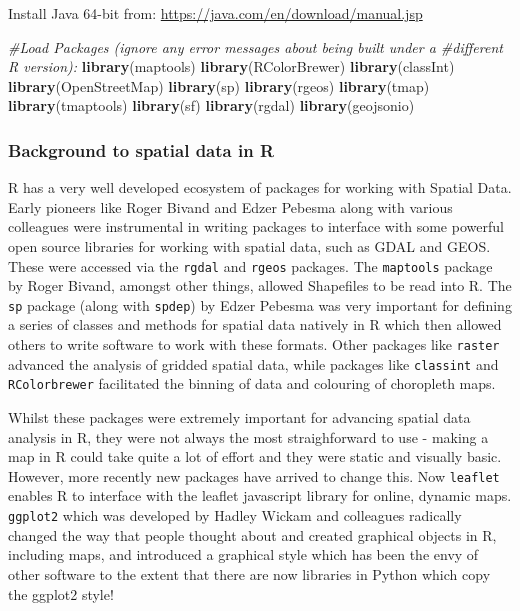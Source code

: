 \documentclass[]{book}
\newenvironment{Shaded}{\begin{snugshade}}{\end{snugshade}}
\newcommand{\CommentTok}[1]{\textcolor[rgb]{0.56,0.35,0.01}{\textit{#1}}}
\newcommand{\KeywordTok}[1]{\textcolor[rgb]{0.13,0.29,0.53}{\textbf{#1}}}
\newcommand{\NormalTok}[1]{#1}
\begin{document}
Install Java 64-bit from: \url{https://java.com/en/download/manual.jsp}

\begin{Shaded}
\begin{Highlighting}[]
\CommentTok{#Load Packages (ignore any error messages about being built under a #different R version):}
\KeywordTok{library}\NormalTok{(maptools)}
\KeywordTok{library}\NormalTok{(RColorBrewer)}
\KeywordTok{library}\NormalTok{(classInt)}
\KeywordTok{library}\NormalTok{(OpenStreetMap)}
\KeywordTok{library}\NormalTok{(sp)}
\KeywordTok{library}\NormalTok{(rgeos)}
\KeywordTok{library}\NormalTok{(tmap)}
\KeywordTok{library}\NormalTok{(tmaptools)}
\KeywordTok{library}\NormalTok{(sf)}
\KeywordTok{library}\NormalTok{(rgdal)}
\KeywordTok{library}\NormalTok{(geojsonio)}
\end{Highlighting}
\end{Shaded}

\hypertarget{background-to-spatial-data-in-r}{%
\subsubsection{Background to spatial data in R}\label{background-to-spatial-data-in-r}}

R has a very well developed ecosystem of packages for working with Spatial Data. Early pioneers like Roger Bivand and Edzer Pebesma along with various colleagues were instrumental in writing packages to interface with some powerful open source libraries for working with spatial data, such as GDAL and GEOS. These were accessed via the \texttt{rgdal} and \texttt{rgeos} packages. The \texttt{maptools} package by Roger Bivand, amongst other things, allowed Shapefiles to be read into R. The \texttt{sp} package (along with \texttt{spdep}) by Edzer Pebesma was very important for defining a series of classes and methods for spatial data natively in R which then allowed others to write software to work with these formats. Other packages like \texttt{raster} advanced the analysis of gridded spatial data, while packages like \texttt{classint} and \texttt{RColorbrewer} facilitated the binning of data and colouring of choropleth maps.

Whilst these packages were extremely important for advancing spatial data analysis in R, they were not always the most straighforward to use - making a map in R could take quite a lot of effort and they were static and visually basic. However, more recently new packages have arrived to change this. Now \texttt{leaflet} enables R to interface with the leaflet javascript library for online, dynamic maps. \texttt{ggplot2} which was developed by Hadley Wickam and colleagues radically changed the way that people thought about and created graphical objects in R, including maps, and introduced a graphical style which has been the envy of other software to the extent that there are now libraries in Python which copy the ggplot2 style!
\end{document}
